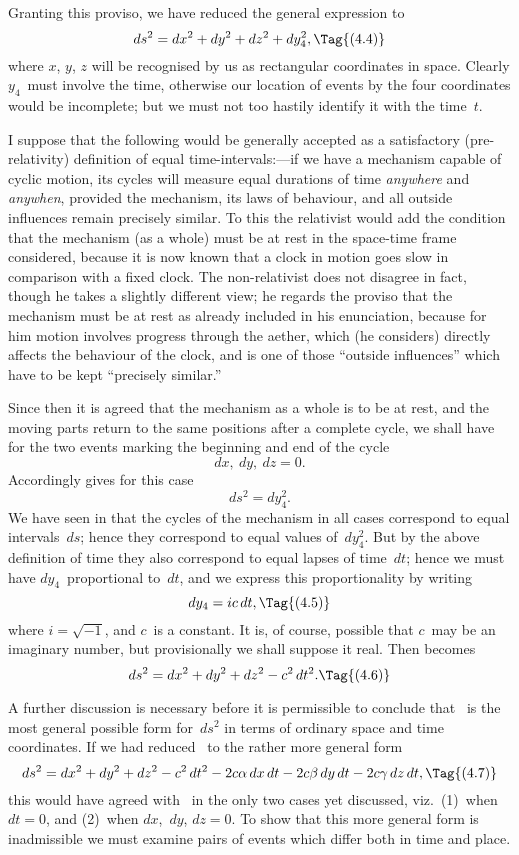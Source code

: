 \documentclass[12pt]{book}
\begin{document}
Granting this proviso, we have reduced the general expression to
\[
ds^{2} = dx^{2} + dy^{2} + dz^{2} + dy_{4}^{2},
\Tag{(4.4)}
\]
where $x$, $y$, $z$ will be recognised by us as rectangular coordinates in space.
Clearly $y_{4}$~must involve the time, otherwise our location of events by the four
coordinates would be incomplete; but we must not too hastily identify it
with the time~$t$.

I suppose that the following would be generally accepted as a satisfactory
(pre-relativity) definition of equal time-intervals:---if we have a mechanism
%
capable of cyclic motion, its cycles will measure equal durations of time
\emph{anywhere} and \emph{anywhen}, provided the mechanism, its laws of behaviour, and
all outside influences remain precisely similar. To this the relativist would
add the condition that the mechanism (as a whole) must be at rest in the
space-time frame considered, because it is now known that a clock in motion
goes slow in comparison with a fixed clock. The non-relativist does not disagree
in fact, though he takes a slightly different view; he regards the proviso
that the mechanism must be at rest as already included in his enunciation,
because for him motion involves progress through the aether, which (he
considers) directly affects the behaviour of the clock, and is one of those
``outside influences'' which have to be kept ``precisely similar.''

Since then it is agreed that the mechanism as a whole is to be at rest,
and the moving parts return to the same positions after a complete cycle, we
shall have for the two events marking the beginning and end of the cycle
\[
dx,\ dy,\ dz = 0.
\]
Accordingly  gives for this case
\[
ds^{2} = dy_{4}^{2}.
\]
We have seen in  that the cycles of the mechanism in all cases correspond
to equal intervals~$ds$; hence they correspond to equal values of~$dy_{4}^{2}$. But by
the above definition of time they also correspond to equal lapses of time~$dt$;
hence we must have $dy_{4}$~proportional to~$dt$, and we express this proportionality
by writing
\[
dy_{4} = ic\, dt,
\Tag{(4.5)}
\]
where $i = \sqrt{-1}$, and $c$~is a constant. It is, of course, possible that $c$~may be
an imaginary number, but provisionally we shall suppose it real. Then 
becomes
\[
ds^{2} = dx^{2} + dy^{2} + dz^{2} - c^{2}\, dt^{2}.
\Tag{(4.6)}
\]

A further discussion is necessary before it is permissible to conclude that
~is the most general possible form for~$ds^{2}$ in terms of ordinary space and
time coordinates. If we had reduced~ to the rather more general form
\[
ds^{2} = dx^{2} + dy^{2} + dz^{2} - c^{2}\, dt^{2} - 2c\alpha\, dx\, dt - 2c\beta\, dy\, dt - 2c\gamma\, dz\, dt,
\Tag{(4.7)}
\]
this would have agreed with~ in the only two cases yet discussed, viz.\
(1)~when $dt = 0$, and (2)~when $dx$,~$dy$, $dz = 0$. To show that this more general
form is inadmissible we must examine pairs of events which differ both in
time and place.
\end{document}
